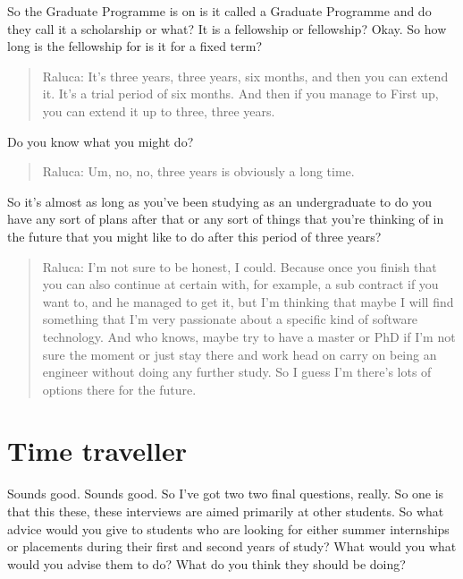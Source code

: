 \documentclass[
]{book}
\begin{document}
So the Graduate Programme is on is it called a Graduate Programme and do they call it a scholarship or what? It is a fellowship or fellowship? Okay. So how long is the fellowship for is it for a fixed term?

\begin{quote}
Raluca: It's three years, three years, six months, and then you can extend it. It's a trial period of six months. And then if you manage to First up, you can extend it up to three, three years.
\end{quote}

Do you know what you might do?

\begin{quote}
Raluca: Um, no, no, three years is obviously a long time.
\end{quote}

So it's almost as long as you've been studying as an undergraduate to do you have any sort of plans after that or any sort of things that you're thinking of in the future that you might like to do after this period of three years?

\begin{quote}
Raluca: I'm not sure to be honest, I could. Because once you finish that you can also continue at certain with, for example, a sub contract if you want to, and he managed to get it, but I'm thinking that maybe I will find something that I'm very passionate about a specific kind of software technology. And who knows, maybe try to have a master or PhD if I'm not sure the moment or just stay there and work head on carry on being an engineer without doing any further study. So I guess I'm there's lots of options there for the future.
\end{quote}

\hypertarget{time-traveller}{%
\section{Time traveller}\label{time-traveller}}

Sounds good. Sounds good. So I've got two two final questions, really. So one is that this these, these interviews are aimed primarily at other students. So what advice would you give to students who are looking for either summer internships or placements during their first and second years of study? What would you what would you advise them to do? What do you think they should be doing?
\end{document}
